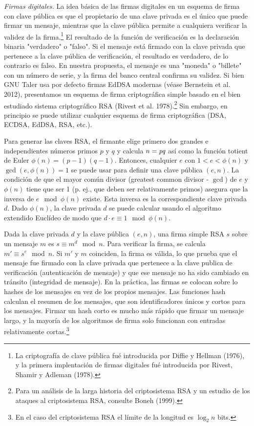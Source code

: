 \documentclass[10pt,spanish]{article}
\begin{document}
\emph{Firmas digitales.} La idea básica de las firmas digitales en un
esquema de firma con clave pública es que el propietario de una clave
privada es el único que puede firmar un mensaje, mientras que la clave
pública permite a cualquiera verificar la validez de la
firma.\footnote{La criptografía de clave pública fué introducida por
Diffie y Hellman (1976), y la primera implentación de firmas digitales
fué introducida por Rivest, Shamir y Adleman (1978).} El resultado de
la función de verificación es la declaración binaria "verdadero" o
"falso". Si el mensaje está firmado con la clave privada que pertenece a
la clave pública de verificación, el resultado es verdadero, de lo
contrario es falso. En nuestra propuesta, el mensaje es una "moneda" o
"billete" con un número de serie, y la firma del banco central confirma
su validez. Si bien GNU Taler usa por defecto firmas EdDSA modernas
(véase Bernstein et al. 2012), presentamos un esquema de firma
criptográfica simple basado en el bien estudiado sistema criptográfico
RSA (Rivest et al. 1978).\footnote{Para un análisis de la larga historia
del criptosistema RSA y un estudio de los ataques al criptosistema RSA,
consulte Boneh (1999).} Sin embargo, en principio se puede utilizar
cualquier esquema de firma criptográfica (DSA, ECDSA, EdDSA, RSA, etc.).

Para generar las claves RSA, el firmante elige primero dos grandes e
independientes números primos $p$ y $q$ y calcula $n = \emph{pq}$
así como la función totient de Euler
$\phi(n) = (p - 1)(q - 1)$.
Entonces, cualquier $e$ con $1 < e < \phi(n)$ y
$\gcd(e, \phi(n)) = 1$ se puede usar para
definir una clave pública $(e,n)$. La condición de que el
mayor común divisor (greatest common divisor - $\gcd$) de $e$ y
$\phi(n)$ tiene que ser 1 (p. ej., que deben ser
relativamente primos) asegura que la inversa de
$e \mod \phi(n)$ existe.
Esta inversa es la
correspondiente clave privada $d$. Dado $\phi(n)$, la clave
privada $d$ se puede calcular usando el algoritmo extendido
Euclídeo de modo que
$d \cdot e \equiv 1 \mod \phi(n)$.

Dada la clave privada $d$ y la clave pública $(e, n)$, una firma simple RSA
$s$ sobre un mensaje $m$ es
$s \equiv m^{d} \mod n$.
Para verificar la firma, se calcula
$m' \equiv s^{e} \mod n$.
Si $m'$ y $m$ coinciden, la firma es válida, lo que prueba que el
mensaje fue firmado con la clave privada que pertenece a la clave
publica de verificación (autenticación de mensaje) y que ese mensaje no
ha sido cambiado en tránsito (integridad de mensaje). En la práctica,
las firmas se colocan sobre lo hashes de los mensajes en vez de los
propios mensajes. Las funciones hash calculan el resumen de los
mensajes, que son identificadores únicos y cortos para los mensajes.
Firmar un hash corto es mucho más rápido que firmar un mensaje largo, y
la mayoría de los algoritmos de firma solo funcionan con entradas
relativamente cortas.\footnote{En el caso del criptosistema RSA el
límite de la longitud es $\log_{2}n$ bits.}
\end{document}
